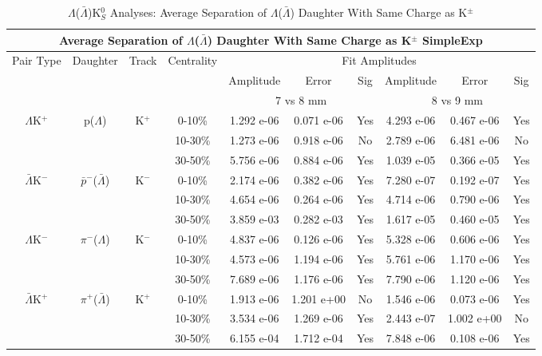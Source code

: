 \documentclass[../AnalysisNoteJBuxton.tex]{subfiles}
\begin{document}
\begin{table}
 \centering
 \begin{tabular}{|c|c|c|c|c|c|c||c|c|c|}
  \multicolumn{10}{c}{Average Separation of $\Lambda$($\bar{\Lambda}$) Daughter With Same Charge as K$^{\pm}$ SimpleExp} \\
  \hline
  \multirow{3}{*}{Pair Type} & \multirow{3}{*}{Daughter} & \multirow{3}{*}{Track} & \multirow{3}{*}{Centrality} & \multicolumn{6}{c|}{Fit Amplitudes} \\
  \cline{5-10}
   & & & & Amplitude & Error & Sig & Amplitude & Error & Sig \\  
  \cline{5-10}
   & & & & \multicolumn{3}{c||}{7 vs 8 mm} & \multicolumn{3}{c|}{8 vs 9 mm} \\  
  \hline
  \multirow{3}{*}{$\Lambda$K$^{+}$} & \multirow{3}{*}{p($\Lambda$)} & \multirow{3}{*}{K$^{+}$}
   &      0-10\% & 1.292 e-06 & 0.071 e-06 & Yes & 4.293 e-06 & 0.467 e-06 & Yes \\
   & & & 10-30\% & 1.273 e-06 & 0.918 e-06 & No & 2.789 e-06 & 6.481 e-06 & No \\
   & & & 30-50\% & 5.756 e-06 & 0.884 e-06 & Yes & 1.039 e-05 & 0.366 e-05 & Yes \\
  \hline
  \multirow{3}{*}{$\bar{\Lambda}$K$^{-}$} & \multirow{3}{*}{$\bar{p}^{-}$($\bar{\Lambda}$)} & \multirow{3}{*}{K$^{-}$}
   &      0-10\% & 2.174 e-06 & 0.382 e-06 & Yes & 7.280 e-07 & 0.192 e-07 & Yes \\
   & & & 10-30\% & 4.654 e-06 & 0.264 e-06 & Yes & 4.714 e-06 & 0.790 e-06 & Yes \\
   & & & 30-50\% & 3.859 e-03 & 0.282 e-03 & Yes & 1.617 e-05 & 0.460 e-05 & Yes \\
  \hline \hline
  \multirow{3}{*}{$\Lambda$K$^{-}$} & \multirow{3}{*}{$\pi^{-}$($\Lambda$)} & \multirow{3}{*}{K$^{-}$}
   &      0-10\% & 4.837 e-06 & 0.126 e-06 & Yes & 5.328 e-06 & 0.606 e-06 & Yes \\
   & & & 10-30\% & 4.573 e-06 & 1.194 e-06 & Yes & 5.761 e-06 & 1.170 e-06 & Yes \\
   & & & 30-50\% & 7.689 e-06 & 1.176 e-06 & Yes & 7.790 e-06 & 1.120 e-06 & Yes \\
  \hline
  \multirow{3}{*}{$\bar{\Lambda}$K$^{+}$} & \multirow{3}{*}{$\pi^{+}$($\bar{\Lambda}$)} & \multirow{3}{*}{K$^{+}$}
   &      0-10\% & 1.913 e-06 & 1.201 e+00 & No & 1.546 e-06 & 0.073 e-06 & Yes \\
   & & & 10-30\% & 3.534 e-06 & 1.269 e-06 & Yes & 2.443 e-07 & 1.002 e+00 & No \\
   & & & 30-50\% & 6.155 e-04 & 1.712 e-04 & Yes & 7.848 e-06 & 0.108 e-06 & Yes \\
  \hline
 \end{tabular}
 \caption{$\Lambda$($\bar{\Lambda}$)K$^{0}_{S}$ Analyses: Average Separation of $\Lambda$($\bar{\Lambda}$) Daughter With Same Charge as K$^{\pm}$}
 \label{tab:AvgSepLamKch_SimpleExp}
\end{table}
\end{document}
